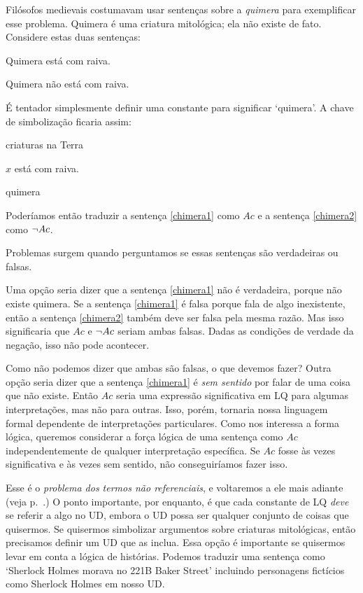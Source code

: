 Filósofos medievais costumavam usar sentenças sobre a \emph{quimera} para exemplificar esse problema. Quimera é uma criatura mitológica; ela não existe de fato. Considere estas duas sentenças:
\begin{earg}
\item[\ex{chimera1}] Quimera está com raiva.
\item[\ex{chimera2}] Quimera não está com raiva.
\end{earg}
É tentador simplesmente definir uma constante para significar `quimera'. A chave de simbolização ficaria assim:
\begin{ekey}
\item[UD:] criaturas na Terra
\item[Ax:] $x$ está com raiva.
\item[c:] quimera
\end{ekey}
Poderíamos então traduzir a sentença \ref{chimera1} como $Ac$ e a sentença \ref{chimera2} como $\neg Ac$.

Problemas surgem quando perguntamos se essas sentenças são verdadeiras ou falsas.

Uma opção seria dizer que a sentença \ref{chimera1} não é verdadeira, porque não existe quimera. Se a sentença \ref{chimera1} é falsa porque fala de algo inexistente, então a sentença \ref{chimera2} também deve ser falsa pela mesma razão. Mas isso significaria que $Ac$ e $\neg Ac$ seriam ambas falsas. Dadas as condições de verdade da negação, isso não pode acontecer.

Como não podemos dizer que ambas são falsas, o que devemos fazer? Outra opção seria dizer que a sentença \ref{chimera1} é \emph{sem sentido} por falar de uma coisa que não existe. Então $Ac$ seria uma expressão significativa em LQ para algumas interpretações, mas não para outras. Isso, porém, tornaria nossa linguagem formal dependente de interpretações particulares. Como nos interessa a forma lógica, queremos considerar a força lógica de uma sentença como $Ac$ independentemente de qualquer interpretação específica. Se $Ac$ fosse às vezes significativa e às vezes sem sentido, não conseguiríamos fazer isso.

Esse é o \emph{problema dos termos não referenciais}, e voltaremos a ele mais adiante (veja p.~\pageref{subsec.defdesc}.) O ponto importante, por enquanto, é que cada constante de LQ \emph{deve} se referir a algo no UD, embora o UD possa ser qualquer conjunto de coisas que quisermos. Se quisermos simbolizar argumentos sobre criaturas mitológicas, então precisamos definir um UD que as inclua. Essa opção é importante se quisermos levar em conta a lógica de histórias. Podemos traduzir uma sentença como `Sherlock Holmes morava no 221B Baker Street' incluindo personagens fictícios como Sherlock Holmes em nosso UD.


